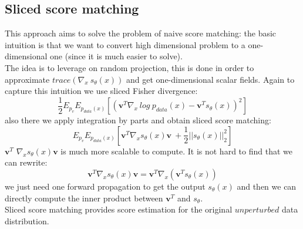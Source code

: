 \documentclass{article}
\begin{document}
	\subsection{Sliced score matching}
	This approach aims to solve the problem of naive score matching: the basic intuition is that we want to convert high dimensional problem to a one-dimensional one (since it is much easier to solve). \\
	The idea is to leverage on random projection, this is done in order to approximate $trace(\nabla_{x}\ s_{\theta}(x))$ and get one-dimensional scalar fields. Again to capture this intuition we use sliced Fisher divergence:
	\begin{equation}
	\frac{1}{2}E_{p_{v}}E_{p_{data}(x)}[(\mathbf{v}^{T}\nabla_{x}\ log\ p_{data}(x) - \mathbf{v}^{T}s_{\theta}(x) )^{2}]
	\end{equation}
	also there we apply integration by parts and obtain sliced score matching:
	\begin{equation}
	E_{p_{v}}E_{p_{data}(x)}[\mathbf{v}^{T}\nabla_{x} s_{\theta}(x) \mathbf{v}\ +\frac{1}{2}||s_{\theta}(x)||_{2}^{2}]
	\end{equation}
	$\mathbf{v}^{T}$ $\nabla_{x}s_{\theta}(x)\mathbf{v}$ is much more scalable to compute. It is not hard to find that we can rewrite:
	\begin{equation}
	\mathbf{v}^{T}\nabla_{x}s_{\theta}(x)\mathbf{v} = \mathbf{v}^{T}\nabla_{x}(\mathbf{v}^{T}s_{\theta}(x))
	\end{equation}
	we just need one forward propagation to get the output $s_{\theta}(x)$ and then we can directly compute the inner product between $\mathbf{v}^{T}$ and $s_{\theta}$.\\
	Sliced score matching provides score estimation for the original $unperturbed$ data distribution.
\end{document}
